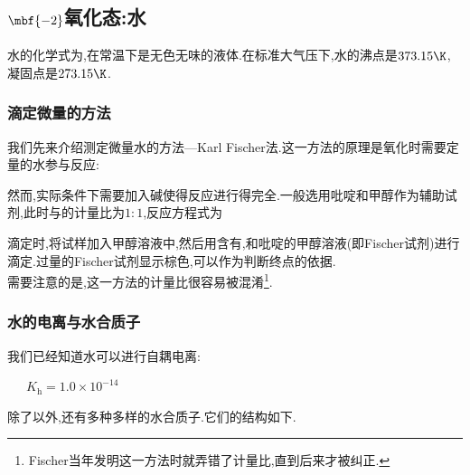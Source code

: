 \documentclass{ctexart}
\begin{document}
\subsection{$\mbf{-2}$氧化态:水}
\begin{substance}[\ce{H2O}]
    水的化学式为,在常温下是无色无味的液体.在标准大气压下,水的沸点是$373.15\K$,凝固点是$273.15\K$.
\end{substance}
\subsubsection{滴定微量的方法}
我们先来介绍测定微量水的方法—Karl Fischer法.这一方法的原理是氧化时需要定量的水参与反应:
\begin{center}
\end{center}
然而,实际条件下需要加入碱使得反应进行得完全.一般选用吡啶和甲醇作为辅助试剂,此时与的计量比为$1:1$,反应方程式为
\begin{center}
\end{center}
滴定时,将试样加入甲醇溶液中,然后用含有,和吡啶的甲醇溶液(即Fischer试剂)进行滴定.过量的Fischer试剂显示棕色,可以作为判断终点的依据.\\
\indent 需要注意的是,这一方法的计量比很容易被混淆\footnote{Fischer当年发明这一方法时就弄错了计量比,直到后来才被纠正.}.\subsubsection{水的电离与水合质子}我们已经知道水可以进行自耦电离:
\begin{center}
    \ \ \ $K_\text{h}=1.0\times10^{-14}$
\end{center}
\indent 除了以外,还有多种多样的水合质子.它们的结构如下.
\end{document}
